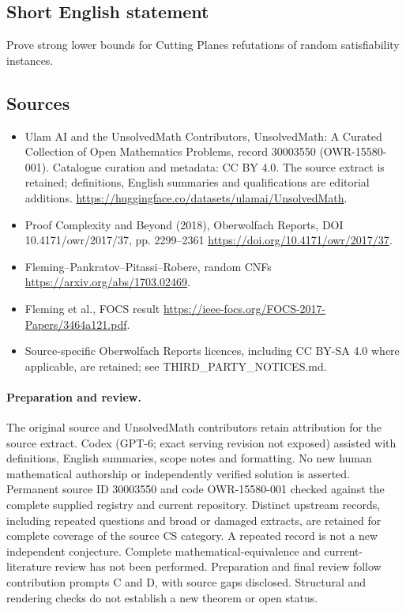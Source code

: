 \documentclass[11pt]{article}
\begin{document}
\subsection{Short English statement}
Prove strong lower bounds for Cutting Planes refutations of random satisfiability instances.
\subsection{Sources}
\begin{itemize}
\item[\hypertarget{source:30003550:1}{S1}] Ulam AI and the UnsolvedMath Contributors, UnsolvedMath: A Curated Collection of Open Mathematics Problems, record 30003550 (OWR-15580-001). Catalogue curation and metadata: CC BY 4.0. The source extract is retained; definitions, English summaries and qualifications are editorial additions.
\url{https://huggingface.co/datasets/ulamai/UnsolvedMath}.
\item[\hypertarget{source:30003550:2}{S2}] Proof Complexity and Beyond (2018), Oberwolfach Reports, DOI 10.4171/owr/2017/37, pp. 2299--2361
\url{https://doi.org/10.4171/owr/2017/37}.
\item[\hypertarget{source:30003550:3}{S3}] Fleming--Pankratov--Pitassi--Robere, random CNFs
\url{https://arxiv.org/abs/1703.02469}.
\item[\hypertarget{source:30003550:4}{S4}] Fleming et al., FOCS result
\url{https://ieee-focs.org/FOCS-2017-Papers/3464a121.pdf}.
\item Source-specific Oberwolfach Reports licences, including CC BY-SA 4.0 where applicable, are retained; see THIRD\_PARTY\_NOTICES.md.
\end{itemize}
\paragraph{Preparation and review.}
The original source and UnsolvedMath contributors retain attribution for the source extract. Codex (GPT-6; exact serving revision not exposed) assisted with definitions, English summaries, scope notes and formatting. No new human mathematical authorship or independently verified solution is asserted. Permanent source ID 30003550 and code OWR-15580-001 checked against the complete supplied registry and current repository. Distinct upstream records, including repeated questions and broad or damaged extracts, are retained for complete coverage of the source CS category. A repeated record is not a new independent conjecture. Complete mathematical-equivalence and current-literature review has not been performed. Preparation and final review follow contribution prompts C and D, with source gaps disclosed. Structural and rendering checks do not establish a new theorem or open status.
\label{end:30003550}
\end{document}
